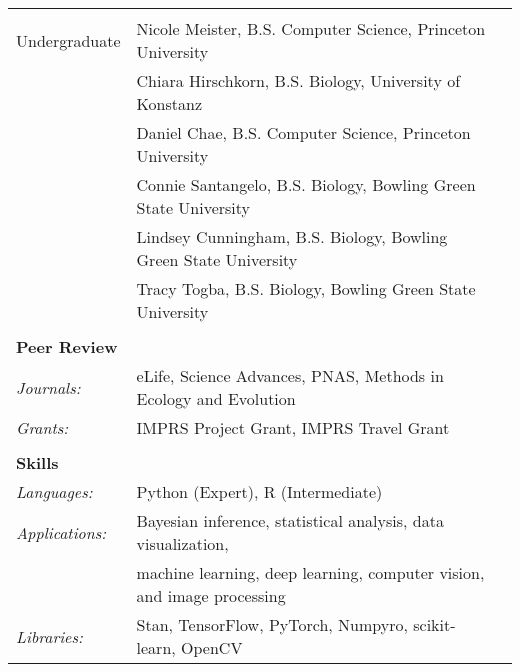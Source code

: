 \documentclass[letterpaper,10pt,oneside]{article}
\begin{document}
\begin{small}
\begin{longtable}{@{} l p{5.3in}l}
 & \\
 \large{Undergraduate}
 & Nicole Meister, B.S. Computer Science, Princeton University \\
  & Chiara Hirschkorn, B.S. Biology, University of Konstanz \\
  & Daniel Chae, B.S. Computer Science, Princeton University \\
 &  Connie Santangelo, B.S. Biology, Bowling Green State University \\
 & Lindsey Cunningham, B.S. Biology, Bowling Green State University \\
 & Tracy Togba, B.S. Biology, Bowling Green State University \\
& \\

 \Large{\textbf{Peer Review}}  \vspace{5mm} \\
 \normalsize{\textit{Journals: }} & eLife, Science Advances, PNAS, Methods in Ecology and Evolution \vspace{1mm} \\
 \normalsize{\textit{Grants: }} & IMPRS Project Grant, IMPRS Travel Grant \vspace{1mm} \\
 & \\

\Large{\textbf{Skills}} \vspace{5mm} \\
\normalsize{\textit{Languages: }}
& Python (Expert), R (Intermediate) \vspace{1mm}\\ %
\normalsize{\textit{Applications: }} 
& Bayesian inference, statistical analysis, data visualization, \\ 
& machine learning, deep learning, computer vision, and image processing \vspace{1mm}\\
\normalsize{\textit{Libraries: }}
& Stan, TensorFlow, PyTorch, Numpyro, scikit-learn, OpenCV \\
\end{longtable}
\end{small}
\end{document}
